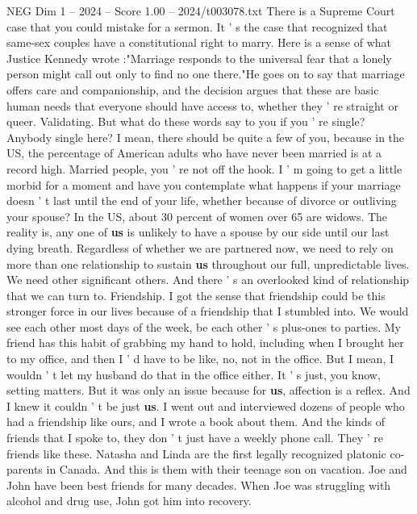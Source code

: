 \begin{textsample}{NEG Dim 1 – 2024 – Score 1.00 – 2024/t003078.txt}  \label{ex:f1_neg_033}
There is a Supreme Court case that you could mistake for a sermon.
It ' s the case that recognized that same-sex couples have a constitutional right to marry.
Here is a sense of what Justice Kennedy wrote :"Marriage responds to the universal fear that a lonely person might call out only to find no one there."He goes on to say that marriage offers care and companionship, and the decision argues that these are basic human needs that everyone should have access to, whether they ' re straight or queer.
Validating.
But what do these words say to you if you ' re single?
Anybody single here?
I mean, there should be quite a few of you, because in the US, the percentage of American adults who have never been married is at a record high.
Married people, you ' re not off the hook.
I ' m going to get a little morbid for a moment and have you contemplate what happens if your marriage doesn ' t last until the end of your life, whether because of divorce or outliving your spouse?
In the US, about 30 percent of women over 65 are widows.
The reality is, any one of \textbf{us} is unlikely to have a spouse by our side until our last dying breath.
Regardless of whether we are partnered now, we need to rely on more than one relationship to sustain \textbf{us} throughout our full, unpredictable lives.
We need other significant others.
And there ' s an overlooked kind of relationship that we can turn to.
Friendship.
I got the sense that friendship could be this stronger force in our lives because of a friendship that I stumbled into.
We would see each other most days of the week, be each other ' s plus-ones to parties.
My friend has this habit of grabbing my hand to hold, including when I brought her to my office, and then I ' d have to be like, no, not in the office.
But I mean, I wouldn ' t let my husband do that in the office either.
It ' s just, you know, setting matters.
But it was only an issue because for \textbf{us}, affection is a reflex.
And I knew it couldn ' t be just \textbf{us}.
I went out and interviewed dozens of people who had a friendship like ours, and I wrote a book about them.
And the kinds of friends that I spoke to, they don ' t just have a weekly phone call.
They ' re friends like these.
Natasha and Linda are the first legally recognized platonic co-parents in Canada.
And this is them with their teenage son on vacation.
Joe and John have been best friends for many decades.
When Joe was struggling with alcohol and drug use, John got him into recovery.

\end{textsample}
